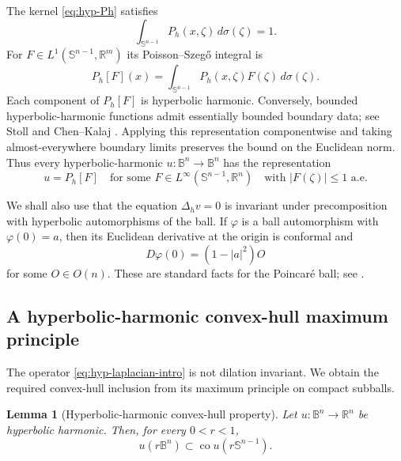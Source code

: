\documentclass[11pt,reqno]{amsart}
\newtheorem{lemma}[theorem]{Lemma}
\theoremstyle{remark}
\newcommand{\R}{\mathbb R}
\newcommand{\B}{\mathbb B}
\newcommand{\Sph}{\mathbb S}
\newcommand{\co}{\operatorname{co}}
\newcommand{\Ph}{P_h}
\newcommand{\Dh}{\Delta_h}
\begin{document}
The kernel \eqref{eq:hyp-Ph} satisfies
\begin{equation}\label{hyp:eq:Ph-normalization}
 \int_{\Sph^{n-1}}\Ph(x,\zeta)\,d\sigma(\zeta)=1.
\end{equation}
For $F\in L^1(\Sph^{n-1},\R^m)$ its Poisson--Szeg\H{o} integral is
\begin{equation}\label{hyp:eq:Poisson-extension}
 P_h[F](x)=\int_{\Sph^{n-1}}\Ph(x,\zeta)F(\zeta)\,d\sigma(\zeta).
\end{equation}
Each component of $P_h[F]$ is hyperbolic harmonic.  Conversely, bounded
hyperbolic-harmonic functions admit essentially bounded boundary data;
see Stoll \cite[Theorem 7.1.1(c)]{Stoll2016} and Chen--Kalaj
\cite{ChenKalaj2021}.  Applying this representation componentwise and
taking almost-everywhere boundary limits preserves the bound on the
Euclidean norm.  Thus every hyperbolic-harmonic $u:\B^n\to\B^n$ has
the representation
\begin{equation}\label{hyp:eq:boundary-data}
 u=P_h[F]
 \quad\text{for some }F\in L^\infty(\Sph^{n-1},\R^n)
 \quad\text{with }|F(\zeta)|\le1\text{ a.e.}
\end{equation}

We shall also use that the equation $\Dh v=0$ is invariant under precomposition with hyperbolic automorphisms of the ball. If $\varphi$ is a ball automorphism with $\varphi(0)=a$, then its Euclidean derivative at the origin is conformal and
\begin{equation}\label{hyp:eq:automorphism-derivative}
 D\varphi(0)=(1-|a|^2)O
\end{equation}
for some $O\in O(n)$. These are standard facts for the Poincar\'e ball; see \cite{Stoll2016}.

\subsection{A hyperbolic-harmonic convex-hull maximum principle}

The operator \eqref{eq:hyp-laplacian-intro} is not dilation invariant.
We obtain the required convex-hull inclusion from its maximum principle
on compact subballs.

\begin{lemma}[Hyperbolic-harmonic convex-hull property]\label{hyp:lem:convex-hull}
Let $u:\B^n\to\R^n$ be hyperbolic harmonic. Then, for every $0<r<1$,
\begin{equation}\label{hyp:eq:convex-hull-property}
 u(r\B^n)\subset \co u(r\Sph^{n-1}).
\end{equation}
\end{lemma}
\end{document}

